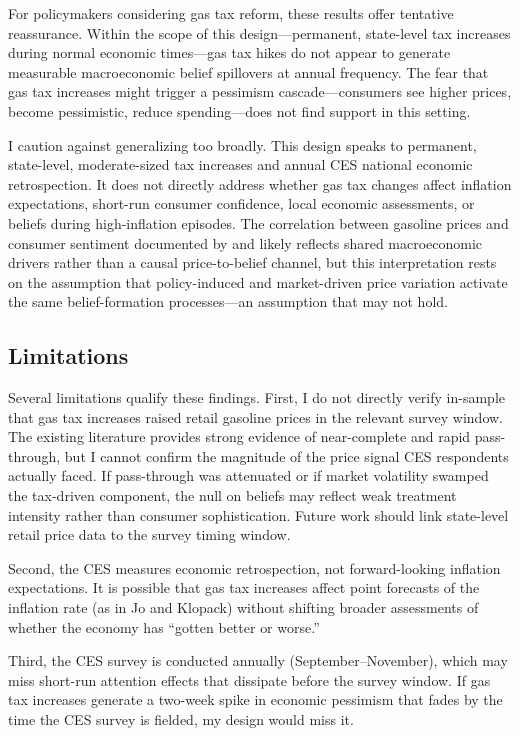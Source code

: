 \documentclass[12pt]{article}
\begin{document}
For policymakers considering gas tax reform, these results offer tentative reassurance. Within the scope of this design---permanent, state-level tax increases during normal economic times---gas tax hikes do not appear to generate measurable macroeconomic belief spillovers at annual frequency. The fear that gas tax increases might trigger a pessimism cascade---consumers see higher prices, become pessimistic, reduce spending---does not find support in this setting.

I caution against generalizing too broadly. This design speaks to permanent, state-level, moderate-sized tax increases and annual CES national economic retrospection. It does not directly address whether gas tax changes affect inflation expectations, short-run consumer confidence, local economic assessments, or beliefs during high-inflation episodes. The correlation between gasoline prices and consumer sentiment documented by \citet{coibion2015information} and \citet{binder2022stuck} likely reflects shared macroeconomic drivers rather than a causal price-to-belief channel, but this interpretation rests on the assumption that policy-induced and market-driven price variation activate the same belief-formation processes---an assumption that may not hold.

\subsection{Limitations}

Several limitations qualify these findings. First, I do not directly verify in-sample that gas tax increases raised retail gasoline prices in the relevant survey window. The existing literature \citep{li2014gasoline} provides strong evidence of near-complete and rapid pass-through, but I cannot confirm the magnitude of the price signal CES respondents actually faced. If pass-through was attenuated or if market volatility swamped the tax-driven component, the null on beliefs may reflect weak treatment intensity rather than consumer sophistication. Future work should link state-level retail price data to the survey timing window.

Second, the CES measures economic retrospection, not forward-looking inflation expectations. It is possible that gas tax increases affect point forecasts of the inflation rate (as in Jo and Klopack) without shifting broader assessments of whether the economy has ``gotten better or worse.''

Third, the CES survey is conducted annually (September--November), which may miss short-run attention effects that dissipate before the survey window. If gas tax increases generate a two-week spike in economic pessimism that fades by the time the CES survey is fielded, my design would miss it.
\end{document}
